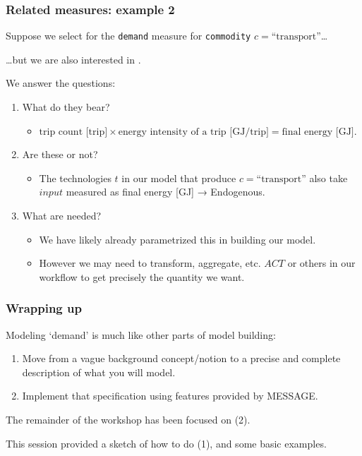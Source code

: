 \documentclass[12pt,aspectratio=169]{beamer}
\begin{document}
\begin{frame}
\frametitle{Related measures: example 2}

Suppose we select  for the \texttt{demand} measure for \texttt{commodity} $c=\text{“transport”}$…

\pause
…but we are also interested in .

\bigskip
We answer the questions:
\begin{enumerate}[<+(1)->]
  \item What  do they bear?
    \begin{itemize}
      \item $\text{trip count [trip]} \times \text{energy intensity of a trip [GJ/trip]} = \text{final energy [GJ]}$.
    \end{itemize}
  \item Are these  or not?
    \begin{itemize}
      \item The technologies $t$ in our model that produce $c=\text{“transport”}$ also take $input$ measured as final energy [GJ] → Endogenous.
    \end{itemize}
  \item What  are needed?
    \begin{itemize}
      \item We have likely already parametrized this in building our model.
      \item However we may need to transform, aggregate, etc. $ACT$ or others in our  workflow to get precisely the quantity we want.
    \end{itemize}
\end{enumerate}
\end{frame}

\begin{frame}
\frametitle{Wrapping up}

Modeling ‘demand’ is much like other parts of model building:
\begin{enumerate}
  \item Move from a vague background concept/notion to a precise and complete description of what you will model.
  \item Implement that specification using features provided by MESSAGE.
\end{enumerate}

\bigskip
The remainder of the workshop has been focused on (2).

\smallskip
This session provided a sketch of how to do (1), and some basic examples.

\end{frame}
\end{document}
